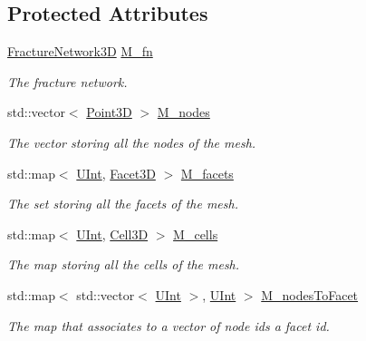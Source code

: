 \subsection*{Protected Attributes}
\begin{DoxyCompactItemize}
\item 
\hyperlink{classFVCode3D_1_1FractureNetwork3D}{Fracture\+Network3D} \hyperlink{classFVCode3D_1_1Mesh3D_ab197671318545b2b026899d435e79ddd}{M\+\_\+fn}
\begin{DoxyCompactList}\small\item\em The fracture network. \end{DoxyCompactList}\item 
std\+::vector$<$ \hyperlink{classFVCode3D_1_1Point3D}{Point3D} $>$ \hyperlink{classFVCode3D_1_1Mesh3D_a5464981fd097ce785675d91522884739}{M\+\_\+nodes}
\begin{DoxyCompactList}\small\item\em The vector storing all the nodes of the mesh. \end{DoxyCompactList}\item 
std\+::map$<$ \hyperlink{namespaceFVCode3D_a4bf7e328c75d0fd504050d040ebe9eda}{U\+Int}, \hyperlink{classFVCode3D_1_1Mesh3D_1_1Facet3D}{Facet3D} $>$ \hyperlink{classFVCode3D_1_1Mesh3D_a57d8b6af7f4385d749c2d83c235764de}{M\+\_\+facets}
\begin{DoxyCompactList}\small\item\em The set storing all the facets of the mesh. \end{DoxyCompactList}\item 
std\+::map$<$ \hyperlink{namespaceFVCode3D_a4bf7e328c75d0fd504050d040ebe9eda}{U\+Int}, \hyperlink{classFVCode3D_1_1Mesh3D_1_1Cell3D}{Cell3D} $>$ \hyperlink{classFVCode3D_1_1Mesh3D_a8cac877e809226fb96078183efb25a2f}{M\+\_\+cells}
\begin{DoxyCompactList}\small\item\em The map storing all the cells of the mesh. \end{DoxyCompactList}\item 
std\+::map$<$ std\+::vector$<$ \hyperlink{namespaceFVCode3D_a4bf7e328c75d0fd504050d040ebe9eda}{U\+Int} $>$, \hyperlink{namespaceFVCode3D_a4bf7e328c75d0fd504050d040ebe9eda}{U\+Int} $>$ \hyperlink{classFVCode3D_1_1Mesh3D_add5bb503fb6d9bf6ee0656f02e712b06}{M\+\_\+nodes\+To\+Facet}
\begin{DoxyCompactList}\small\item\em The map that associates to a vector of node ids a facet id. \end{DoxyCompactList}\end{DoxyCompactItemize}


